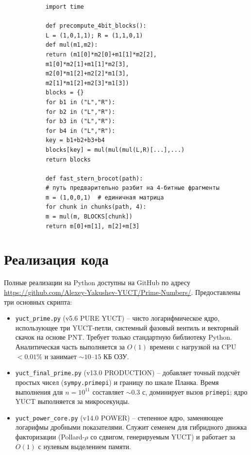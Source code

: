 \documentclass[12pt,a4paper]{article}
\begin{document}
	\begin{tcolorbox}[title=4-битный блочный навигатор (Python), breakable]
		\begin{lstlisting}
			import time
			
			def precompute_4bit_blocks():
			L = (1,0,1,1); R = (1,1,0,1)
			def mul(m1,m2):
			return (m1[0]*m2[0]+m1[1]*m2[2],
			m1[0]*m2[1]+m1[1]*m2[3],
			m2[0]*m1[2]+m2[2]*m1[3],
			m2[1]*m1[2]+m2[3]*m1[3])
			blocks = {}
			for b1 in ("L","R"):
			for b2 in ("L","R"):
			for b3 in ("L","R"):
			for b4 in ("L","R"):
			key = b1+b2+b3+b4
			blocks[key] = mul(mul(mul(L,R)[...],...)
			return blocks
			
			def fast_stern_brocot(path):
			# путь предварительно разбит на 4-битные фрагменты
			m = (1,0,0,1)  # единичная матрица
			for chunk in chunks(path, 4):
			m = mul(m, BLOCKS[chunk])
			return m[0]+m[1], m[2]+m[3]
		\end{lstlisting}
	\end{tcolorbox}
	
	\section{Реализация кода}
	\label{sec:code}
	Полные реализации на Python доступны на GitHub по адресу 
	\url{https://github.com/Alexey-Yakushev-YUCT/Prime-Numbers/}. Предоставлены три основных скрипта:
	
	\begin{itemize}
		\item \texttt{yuct\_prime.py} (v5.6 PURE YUCT) – чисто логарифмическое ядро, использующее три YUCT-петли, системный фазовый вентиль и векторный скачок на основе PNT. Требует только стандартную библиотеку Python. Аналитическая часть выполняется за \(O(1)\) времени с нагрузкой на CPU \(<0.01\%\) и занимает \(\sim 10\)–\(15\) КБ ОЗУ.
		\item \texttt{yuct\_final\_prime.py} (v13.0 PRODUCTION) – добавляет точный подсчёт простых чисел (\texttt{sympy.primepi}) и границу по шкале Планка. Время выполнения для \(n=10^{11}\) составляет \(\sim 0.3\) с, доминирует вызов \texttt{primepi}; ядро YUCT выполняется за микросекунды.
		\item \texttt{yuct\_power\_core.py} (v14.0 POWER) – степенное ядро, заменяющее логарифмы дробными показателями. Служит семенем для гибридного движка факторизации (Pollard-\(\rho\) со сдвигом, генерируемым YUCT) и работает за \(O(1)\) с нулевым выделением памяти.
	\end{itemize}
	
\end{document}
